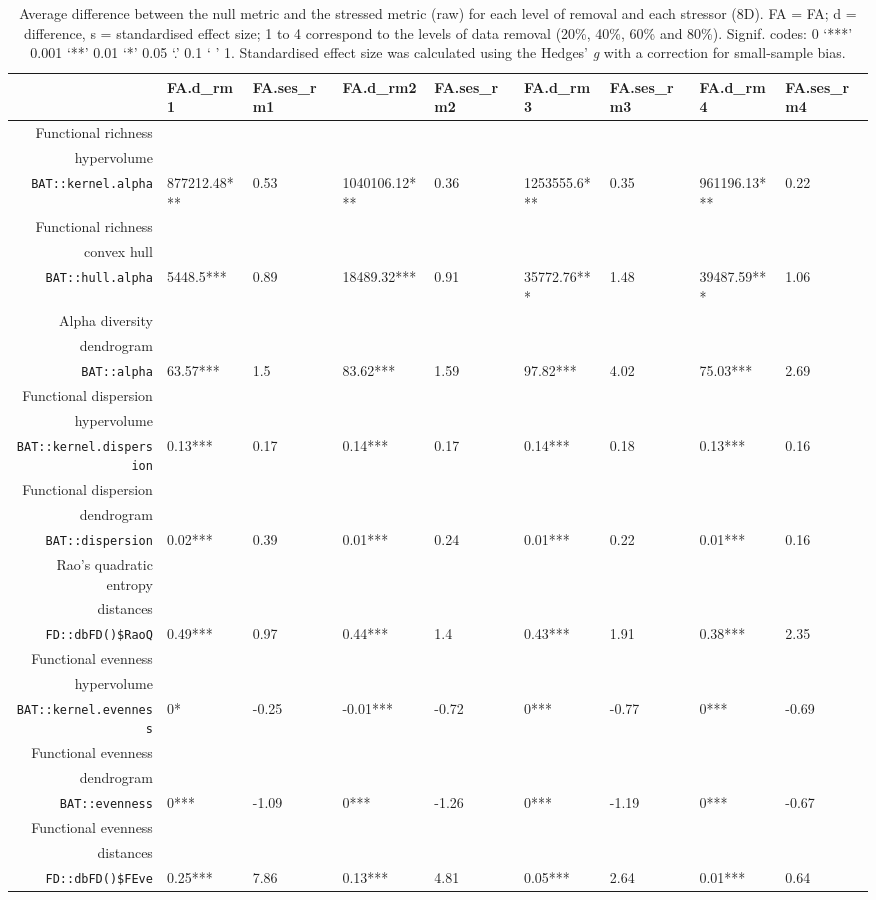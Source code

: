\begin{table}[ht]
\centering
\scriptsize
\begin{tabular}{rllllllll}
  \hline
 & FA.d\_rm1 & FA.ses\_rm1 & FA.d\_rm2 & FA.ses\_rm2 & FA.d\_rm3 & FA.ses\_rm3 & FA.d\_rm4 & FA.ses\_rm4 \\ 
  \hline
  Functional richness\\ hypervolume\\ \texttt{BAT::kernel.alpha} & 877212.48*** & 0.53 & 1040106.12*** & 0.36 & 1253555.6*** & 0.35 & 961196.13*** & 0.22 \\ 
  Functional richness\\ convex hull\\ \texttt{BAT::hull.alpha} & 5448.5*** & 0.89 & 18489.32*** & 0.91 & 35772.76*** & 1.48 & 39487.59*** & 1.06 \\ 
  Alpha diversity\\ dendrogram\\ \texttt{BAT::alpha} & 63.57*** & 1.5 & 83.62*** & 1.59 & 97.82*** & 4.02 & 75.03*** & 2.69 \\ 
  Functional dispersion\\ hypervolume\\ \texttt{BAT::kernel.dispersion} & 0.13*** & 0.17 & 0.14*** & 0.17 & 0.14*** & 0.18 & 0.13*** & 0.16 \\ 
  Functional dispersion\\ dendrogram\\ \texttt{BAT::dispersion} & 0.02*** & 0.39 & 0.01*** & 0.24 & 0.01*** & 0.22 & 0.01*** & 0.16 \\ 
  Rao's quadratic entropy\\ distances\\ \texttt{FD::dbFD()\$RaoQ} & 0.49*** & 0.97 & 0.44*** & 1.4 & 0.43*** & 1.91 & 0.38*** & 2.35 \\ 
  Functional evenness\\ hypervolume\\ \texttt{BAT::kernel.evenness} & 0* & -0.25 & -0.01*** & -0.72 & 0*** & -0.77 & 0*** & -0.69 \\ 
  Functional evenness\\ dendrogram\\ \texttt{BAT::evenness} & 0*** & -1.09 & 0*** & -1.26 & 0*** & -1.19 & 0*** & -0.67 \\ 
  Functional evenness\\ distances\\ \texttt{FD::dbFD()\$FEve} & 0.25*** & 7.86 & 0.13*** & 4.81 & 0.05*** & 2.64 & 0.01*** & 0.64 \\ 
   \hline
\end{tabular}
\caption{Average difference between the null metric and the stressed metric (raw) for each level of removal and each stressor (8D). FA = FA; d = difference, s = standardised effect size; 1 to 4 correspond to the levels of data removal (20\%, 40\%, 60\% and 80\%). Signif. codes:  0 ‘***’ 0.001 ‘**’ 0.01 ‘*’ 0.05 ‘.’ 0.1 ‘ ’ 1. Standardised effect size was calculated using the Hedges' \textit{g} with a correction for small-sample bias.} 
\end{table}
